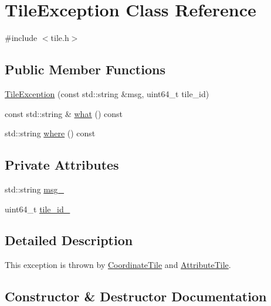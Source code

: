 \hypertarget{classTileException}{}\section{Tile\+Exception Class Reference}
\label{classTileException}


{\ttfamily \#include $<$tile.\+h$>$}

\subsection*{Public Member Functions}
\begin{DoxyCompactItemize}
\item 
\hyperlink{classTileException_a3f5a7d465cd1d434d9bd3c19e93f0bc2}{Tile\+Exception} (const std\+::string \&msg, uint64\+\_\+t tile\+\_\+id)
\item 
const std\+::string \& \hyperlink{classTileException_af16c4c06bd1ecb6de22654e2d5f2a72c}{what} () const 
\item 
std\+::string \hyperlink{classTileException_a8a2b594acc333e22fc6381802fe20cd7}{where} () const 
\end{DoxyCompactItemize}
\subsection*{Private Attributes}
\begin{DoxyCompactItemize}
\item 
std\+::string \hyperlink{classTileException_a9197fbc5c85ba25009fae1e88b7f5881}{msg\+\_\+}
\item 
uint64\+\_\+t \hyperlink{classTileException_a9ff5e438cc1446df9a27bbf85e109e16}{tile\+\_\+id\+\_\+}
\end{DoxyCompactItemize}


\subsection{Detailed Description}
This exception is thrown by \hyperlink{classCoordinateTile}{Coordinate\+Tile} and \hyperlink{classAttributeTile}{Attribute\+Tile}. 

\subsection{Constructor \& Destructor Documentation}
\hypertarget{classTileException_a3f5a7d465cd1d434d9bd3c19e93f0bc2}{}
